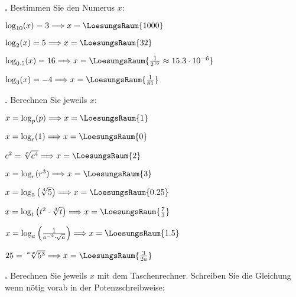\newpage

\textbf{\bbwAufgabenNummer{}.}
Bestimmen Sie den Numerus $x$:

\begin{bbwAufgabenBlock}
\item $\log_{10}(x) = 3 \Longrightarrow x =    \LoesungsRaum{1000}$
\item $\log_{2}(x) = 5 \Longrightarrow x =    \LoesungsRaum{32}$
\item $\log_{0.5}(x) = 16 \Longrightarrow x =    \LoesungsRaum{\frac1{2^{16}}\approx 15.3\cdot{}10^{-6}}$
\item $\log_{3}(x) = -4 \Longrightarrow x =    \LoesungsRaum{\frac1{81}}$
\end{bbwAufgabenBlock}



\newpage

\textbf{\bbwAufgabenNummer{}.}
Berechnen Sie jeweils $x$:

\begin{bbwAufgabenBlock}
\item $x=\log_p(p) \Longrightarrow x =    \LoesungsRaum{1}$
\item $x=\log_c(1) \Longrightarrow x =    \LoesungsRaum{0}$
\item $c^2= \sqrt[x]{c^4} \Longrightarrow x =    \LoesungsRaum{2}$

\item $x=\log_r(r^3) \Longrightarrow x =    \LoesungsRaum{3}$
\item $x=\log_5\left(\sqrt[4]{5}\right) \Longrightarrow x =    \LoesungsRaum{0.25}$
\item $x=\log_t\left(t^2\cdot{}\sqrt[3]{t}\right) \Longrightarrow x =    \LoesungsRaum{\frac73}$
\noTRAINER{\newpage}
\item $x=\log_a\left( \frac1{a^{-2}\cdot{} \sqrt{a}} \right) \Longrightarrow x =    \LoesungsRaum{1.5}$
\item $25=\sqrt[a\cdot{}x]{5^3}  \Longrightarrow x =    \LoesungsRaum{\frac3{2a}}$

\end{bbwAufgabenBlock}


\newpage

\textbf{\bbwAufgabenNummer{}.}
Berechnen Sie jeweils $x$ mit dem Taschenrechner. Schreiben Sie die
Gleichung wenn nötig vorab in der Potenzschreibweise:

